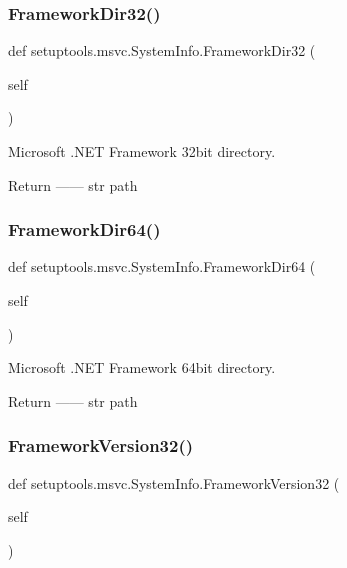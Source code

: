\subsubsection{\texorpdfstring{Framework\+Dir32()}{FrameworkDir32()}}
{\footnotesize\ttfamily def setuptools.\+msvc.\+System\+Info.\+Framework\+Dir32 (\begin{DoxyParamCaption}\item[{}]{self }\end{DoxyParamCaption})}

\begin{DoxyVerb}Microsoft .NET Framework 32bit directory.

Return
------
str
    path
\end{DoxyVerb}
 \mbox{\label{classsetuptools_1_1msvc_1_1SystemInfo_acaec285668f9b2ff4305aaeb660a620a}} 
\subsubsection{\texorpdfstring{Framework\+Dir64()}{FrameworkDir64()}}
{\footnotesize\ttfamily def setuptools.\+msvc.\+System\+Info.\+Framework\+Dir64 (\begin{DoxyParamCaption}\item[{}]{self }\end{DoxyParamCaption})}

\begin{DoxyVerb}Microsoft .NET Framework 64bit directory.

Return
------
str
    path
\end{DoxyVerb}
 \mbox{\label{classsetuptools_1_1msvc_1_1SystemInfo_aad4f31f62e06a1c6c02435a47a85bfff}} 
\subsubsection{\texorpdfstring{Framework\+Version32()}{FrameworkVersion32()}}
{\footnotesize\ttfamily def setuptools.\+msvc.\+System\+Info.\+Framework\+Version32 (\begin{DoxyParamCaption}\item[{}]{self }\end{DoxyParamCaption})}

